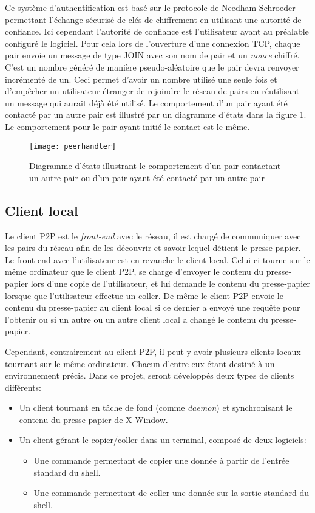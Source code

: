 Ce système d'authentification est basé sur le protocole de Needham-Schroeder
\cite{1978Needham} permettant l'échange sécurisé de clés de chiffrement
en utilisant une autorité de confiance. Ici cependant l'autorité de confiance
est l'utilisateur ayant au préalable configuré le logiciel.
Pour cela lors de l'ouverture d'une connexion TCP, chaque
pair envoie un message de type JOIN avec son nom de pair et un
\emph{nonce} chiffré. C'est un nombre généré de manière pseudo-aléatoire que
le pair devra renvoyer incrémenté de un. Ceci permet d'avoir un nombre
utilisé une seule fois et d'empêcher un utilisateur étranger
de rejoindre le réseau de pairs en réutilisant un message qui aurait déjà
été utilisé. Le comportement d'un pair ayant été contacté par un autre pair
est illustré par un diagramme d'états dans la figure \ref{fig:peerhandler}.
Le comportement pour le pair ayant initié le contact est le même.

\begin{figure}[!h]
  \centering
  \texttt{[image: peerhandler]}
  \caption{Diagramme d'états illustrant le comportement d'un pair
    contactant un autre pair ou d'un pair ayant été contacté par un autre
    pair}
  \label{fig:peerhandler}
\end{figure}

\subsection{Client local}
Le client P2P est le \emph{front-end} avec le réseau, il est chargé
de communiquer avec les pairs du réseau afin de les découvrir et savoir
lequel détient le presse-papier. Le front-end avec l'utilisateur
est en revanche le client local. Celui-ci tourne sur le même ordinateur
que le client P2P, se charge d'envoyer le contenu du presse-papier
lors d'une copie de l'utilisateur, et lui demande le contenu du presse-papier
lorsque que l'utilisateur effectue un coller.
De même le client P2P envoie le contenu du presse-papier au client local si
ce dernier a envoyé une requête pour l'obtenir ou si un autre ou un autre
client local a changé le contenu du presse-papier.

Cependant, contrairement au client P2P, il peut y avoir plusieurs clients
locaux tournant sur le même ordinateur. Chacun d'entre eux étant destiné
à un environnement précis. Dans ce projet, seront développés deux types
de clients différents:
\begin{itemize}
\item Un client tournant en tâche de fond (comme \emph{daemon}) et
  synchronisant le contenu du presse-papier de X Window.
\item Un client gérant le copier/coller dans un terminal, composé de deux
  logiciels:
  \begin{itemize}
  \item Une commande permettant de copier une donnée à partir de l'entrée
    standard du shell.
  \item Une commande permettant de coller une donnée sur la sortie standard
    du shell.
  \end{itemize}
\end{itemize}


